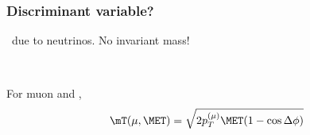 \begin{frame}
\frametitle{Discriminant variable?}

\vfill

\begin{minipage}[c]{.3\textwidth}
\manip \MET\ due to neutrinos.
\manip No invariant mass!
\end{minipage}
\hfill
\begin{minipage}[c]{.45\textwidth}
\begin{center}

\end{center}
\end{minipage}
\hfill~

\vfill\pause

\begin{minipage}[c]{.55\textwidth}
\manip For muon and \MET,
\begin{equation*}
\mT(\mu,\MET) = \sqrt{2p_T^{(\mu)} \MET (1-\cos\Delta\phi)}
\end{equation*}
\begin{center}
\end{center}
\end{minipage}
\qquad
\begin{minipage}[c]{.35\textwidth}
\begin{center}

\end{center}
\end{minipage}
\hfill

\vfill 

\end{frame}

